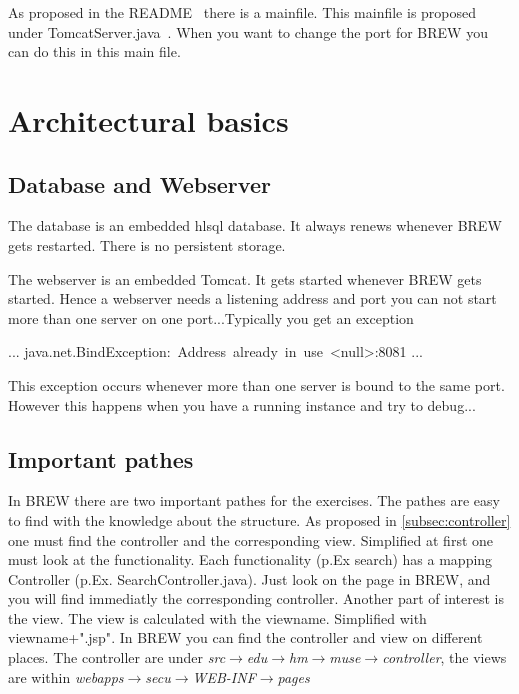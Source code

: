 \documentclass{llncs}%
\begin{document}
As proposed in the {\Tt{}\LA{}README~{\nwtagstyle{}}\RA{}\nwendquote} there is a mainfile. This mainfile is proposed under {\Tt{}\LA{}TomcatServer.java~{\nwtagstyle{}}\RA{}\nwendquote}.
When you want to change the port for BREW you can do this in this main file.

\section{Architectural basics}
\subsection{Database and Webserver}
The database is an embedded hlsql database. It always renews whenever BREW gets restarted. There is no persistent storage. 

The webserver is an embedded Tomcat. It gets started whenever BREW gets started. Hence a webserver needs a listening address and port you can not start more than one server on one port...Typically you get an exception 

{\Tt{}...\nwnewline
java.net.BindException:\ Address\ already\ in\ use\ <null>:8081\nwnewline
...\nwendquote}

This exception occurs whenever more than one server is bound to the same port. However this happens when you have a running instance and try to debug...

\subsection{Important pathes}
In BREW there are two important pathes for the exercises. The pathes are easy to find with the knowledge about the structure. As proposed in \ref{subsec:controller} one must find the controller and the corresponding view. Simplified at first one must look at the functionality. Each functionality (p.Ex search) has a mapping Controller (p.Ex. SearchController.java). Just look on the page in BREW, and you will find immediatly the corresponding controller. Another part of interest is the view. The view is calculated with the viewname. Simplified with {\Tt{}viewname+".jsp"\nwendquote}. In BREW you can find the controller and view on different places.
The controller are under {\em src$\rightarrow$edu$\rightarrow$hm$\rightarrow$muse$\rightarrow$controller}, the views are within {\em webapps$\rightarrow$secu$\rightarrow$WEB-INF$\rightarrow$pages}
 
\end{document}
